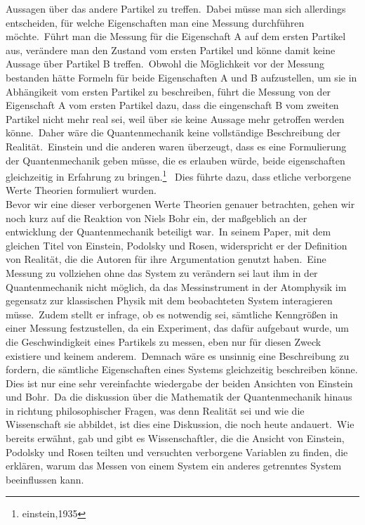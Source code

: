 Aussagen über das andere Partikel zu treffen.\ Dabei müsse man sich allerdings entscheiden, für welche Eigenschaften man eine Messung durchführen möchte.\ Führt man die Messung für die Eigenschaft A auf dem ersten Partikel aus, verändere man den Zustand vom ersten Partikel und könne damit keine Aussage über Partikel
B treffen.\ Obwohl die Möglichkeit vor der Messung bestanden hätte Formeln für beide Eigenschaften A und B aufzustellen, um sie in Abhängikeit vom ersten Partikel zu beschreiben, führt die Messung von der Eigenschaft A vom ersten Partikel dazu, dass die eingenschaft B vom zweiten Partikel nicht mehr real sei, weil über sie
keine Aussage mehr getroffen werden könne.\ Daher wäre die Quantenmechanik keine vollständige Beschreibung der Realität.\ Einstein und die anderen waren überzeugt, dass es eine Formulierung der Quantenmechanik geben müsse, die es erlauben würde, beide eigenschaften gleichzeitig in Erfahrung zu bringen.\footnote{einstein,1935}
\ Dies führte dazu, dass etliche verborgene Werte Theorien formuliert wurden. \\

Bevor wir eine dieser verborgenen Werte Theorien genauer betrachten, gehen wir noch kurz auf die Reaktion von Niels Bohr ein, der maßgeblich an der entwicklung der Quantenmechanik beteiligt war.\
In seinem Paper, mit dem gleichen Titel von Einstein, Podolsky und Rosen, widerspricht er der Definition von Realität, die die Autoren für ihre Argumentation genutzt haben.\ Eine Messung zu vollziehen
ohne das System zu verändern sei laut ihm in der Quantenmechanik nicht möglich, da das Messinstrument in der Atomphysik im gegensatz zur klassischen Physik mit dem beobachteten System interagieren müsse.\
Zudem stellt er infrage, ob es notwendig sei, sämtliche Kenngrößen in einer Messung festzustellen, da ein Experiment, das dafür aufgebaut wurde, um die Geschwindigkeit eines Partikels zu messen, eben nur für diesen Zweck
existiere und keinem anderem.\ Demnach wäre es unsinnig eine Beschreibung zu fordern, die sämtliche Eigenschaften eines Systems gleichzeitig beschreiben könne.\\
Dies ist nur eine sehr vereinfachte wiedergabe der beiden Ansichten von Einstein und Bohr.\ Da die diskussion über die Mathematik der Quantenmechanik hinaus in richtung philosophischer Fragen, was denn Realität sei und wie die Wissenschaft sie abbildet, ist dies
eine Diskussion, die noch heute andauert.\ Wie bereits erwähnt, gab und gibt es Wissenschaftler, die die Ansicht von Einstein, Podolsky und Rosen teilten und versuchten verborgene Variablen zu finden, die erklären, warum das Messen von einem System ein anderes getrenntes System beeinflussen kann.\\


